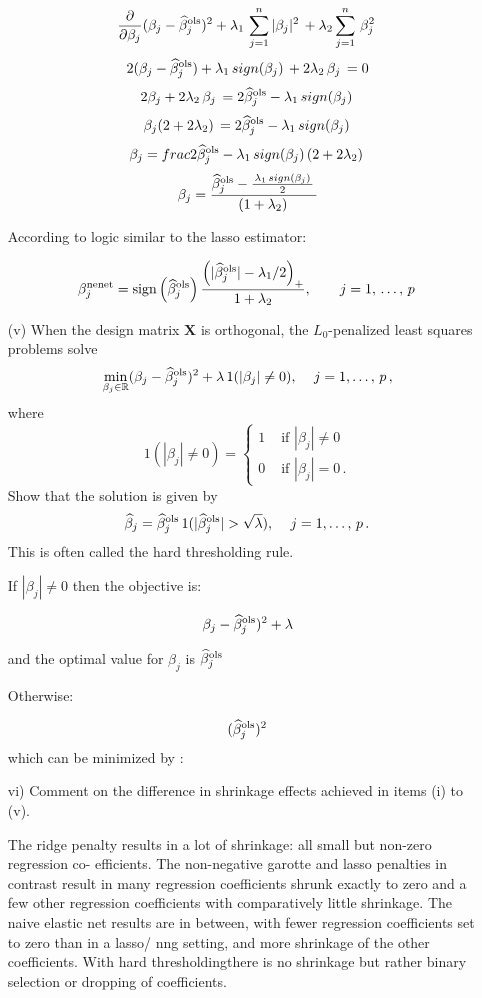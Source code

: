 \documentclass[11pt]{report}
\begin{document}
\begin{itemize}
$$\frac{\partial }{\partial \beta_j}  (\beta_j-\widehat{\beta}_j^{\rm ols})^2+\lambda_1\,\sum_{j=1}^n|\beta_j|^{2}\,+ \lambda_2\sum_{j=1}^n\,\beta_j^{2}\, $$
$$ 2(\beta_j-\widehat{\beta}_j^{\rm ols})+\lambda_1\,sign(\beta_j)\,+ 2\lambda_2 \,\beta_j\, = 0 $$
$$ 2\beta_j + 2\lambda_2 \,\beta_j\,= 2\widehat{\beta}_j^{\rm ols} - \lambda_1\,sign(\beta_j)\,  $$
$$ \beta_j(2 + 2\lambda_2)\,= 2\widehat{\beta}_j^{\rm ols} - \lambda_1\,sign(\beta_j)\,  $$
$$ \beta_j= frac{2\widehat{\beta}_j^{\rm ols} - \lambda_1\,sign(\beta_j)\,}{(2 + 2\lambda_2)\,}  $$
$$ \beta_j= \frac{\widehat{\beta}_j^{\rm ols} - \frac{\,\lambda_1\,sign(\beta_j)\,}{2}\,}{(1 + \lambda_2)\,}  $$

According to logic similar to the lasso estimator:

$$ \beta_j^{\rm nenet}= \text{sign}\left(\widehat{\beta}_j^{\rm ols}\right)\dfrac{\left(|\widehat{\beta}_j^{\rm ols}|-\lambda_1/2 \right)_+}{1+\lambda_2},\qquad j=1,\,\dots,\,p\,  $$


\newpage
\item[(v) ] When the design matrix $\mathbf{X}$ is orthogonal, the $L_0$-penalized least squares problems solve 
$$\min\limits_{\beta_j\in\mathbb{R}}(\beta_j-\widehat{\beta}_j^{\rm ols})^2+\lambda\,1(|\beta_j|\neq 0),\,\quad j=1,\dots,\,p\,,$$
where $$1(|\beta_j|\neq 0)=\begin{cases}
1 & \text{ if } |\beta_j|\neq 0\\
0 & \text{ if } |\beta_j|= 0\,.
\end{cases}$$
Show that the solution is given by
$$\widehat{\beta}_j=\widehat{\beta}_j^{\rm ols}\,1(|\widehat{\beta}_j^{\rm ols}|>\sqrt{\lambda}),\,\quad j=1,\dots,\,p\,.$$
This is often called the hard thresholding rule.

If $|\beta_j|\neq 0$ then the objective is: 

$$\beta_j-\widehat{\beta}_j^{\rm ols})^2 + \lambda$$

and the optimal value for $\beta_j$ is $\widehat{\beta}_j^{\rm ols}$

Otherwise: 

$$(\widehat{\beta}_j^{\rm ols})^2 $$
which can be minimized by :



\item[vi) ] Comment on the difference in shrinkage effects achieved in items (i) to (v).

The ridge penalty results in a lot of shrinkage: all small but non-zero regression co- efficients.
The non-negative garotte and lasso penalties in contrast result in many regression coefficients shrunk exactly to zero and a few other regression coefficients with comparatively little shrinkage. 
The naive elastic net results are in between, with fewer regression coefficients set to zero than in a lasso/ nng setting, and more shrinkage of the other coefficients.
With hard thresholdingthere is no shrinkage but rather binary selection or dropping of coefficients.

\end{itemize}
\vspace{1mm}
\end{document}
